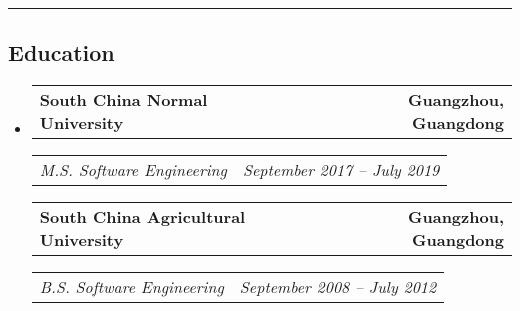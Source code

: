 \documentclass[11pt,letterpaper]{article}
\makeatletter
\newcommand{\headerrow}[2]
{\begin{tabular*}{\linewidth}{l@{\extracolsep{\fill}}r}
#1 &
#2 \\
\end{tabular*}}
\makeatother
\begin{document}
\hrule
\vspace{-1em}
\subsection*{\Large Education}

\begin{itemize}[leftmargin=1em]
	\parskip=0.1em
		
	\item
	      \headerrow
	      {\textbf{South China Normal University}}
	      {\textbf{Guangzhou, Guangdong}}
	      \headerrow
	      {\emph{M.S. Software Engineering}}
	      {\emph{September 2017 -- July 2019}}
            \headerrow
	      {\textbf{South China Agricultural University}}
	      {\textbf{Guangzhou, Guangdong}}
	      \headerrow
	      {\emph{B.S. Software Engineering}}
	      {\emph{September 2008 -- July 2012}}
	      	      
\end{itemize}
\end{document}
